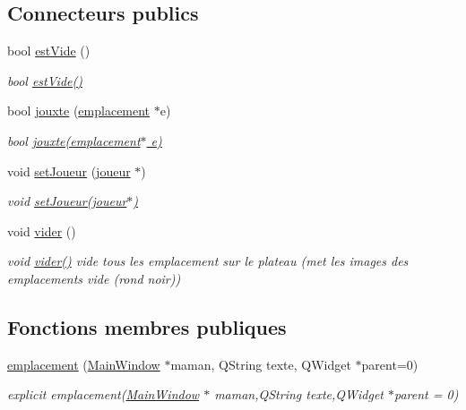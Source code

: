 \subsection*{Connecteurs publics}
\begin{DoxyCompactItemize}
\item 
bool \hyperlink{classemplacement_afd15b612d02b7cbfd0480b5b380c2b07}{est\-Vide} ()
\begin{DoxyCompactList}\small\item\em bool \hyperlink{classemplacement_afd15b612d02b7cbfd0480b5b380c2b07}{est\-Vide()} \end{DoxyCompactList}\item 
bool \hyperlink{classemplacement_a70e22f75b934e4daa40582708c4e01f5}{jouxte} (\hyperlink{classemplacement}{emplacement} $\ast$e)
\begin{DoxyCompactList}\small\item\em bool \hyperlink{classemplacement_a70e22f75b934e4daa40582708c4e01f5}{jouxte(emplacement$\ast$ e)} \end{DoxyCompactList}\item 
void \hyperlink{classemplacement_a9e57590839f9c185d962030b221b8ea1}{set\-Joueur} (\hyperlink{classjoueur}{joueur} $\ast$)
\begin{DoxyCompactList}\small\item\em void \hyperlink{classemplacement_a9e57590839f9c185d962030b221b8ea1}{set\-Joueur(joueur$\ast$)} \end{DoxyCompactList}\item 
void \hyperlink{classemplacement_ada71fd6bec4969e4ef5be1a610d712a4}{vider} ()
\begin{DoxyCompactList}\small\item\em void \hyperlink{classemplacement_ada71fd6bec4969e4ef5be1a610d712a4}{vider()}  vide tous les emplacement sur le plateau (met les images des emplacements vide (rond noir)) \end{DoxyCompactList}\end{DoxyCompactItemize}
\subsection*{Fonctions membres publiques}
\begin{DoxyCompactItemize}
\item 
\hyperlink{classemplacement_af7af55d84628659a8f0ebb01a6af128e}{emplacement} (\hyperlink{class_main_window}{Main\-Window} $\ast$maman, Q\-String texte, Q\-Widget $\ast$parent=0)
\begin{DoxyCompactList}\small\item\em explicit emplacement(\hyperlink{class_main_window}{Main\-Window} $\ast$ maman,Q\-String texte,Q\-Widget $\ast$parent = 0) \end{DoxyCompactList}\end{DoxyCompactItemize}
